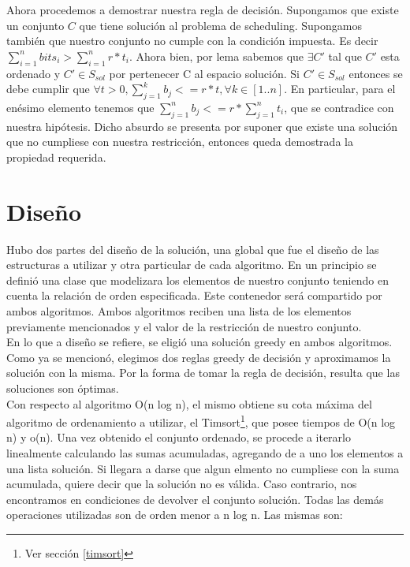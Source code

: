 \documentclass[12pt]{article}
\begin{document}
Ahora procedemos a demostrar nuestra regla de decisi\'on. Supongamos que existe un conjunto $C$ que tiene soluci\'on al
 problema de scheduling. Supongamos tambi\'en que nuestro conjunto no cumple con la condici\'on impuesta. Es decir $\sum\limits_{i=1}^n bits_i > \sum\limits_{i=1}^n r * t_i$.
 Ahora bien, por lema sabemos que $\exists C'$ tal que $C'$ esta ordenado y $C' \in S_{sol}$ por pertenecer C al espacio soluci\'on. Si $C' \in S_{sol}$ entonces se debe cumplir que 
$\forall t > 0, \sum\limits_{j = 1}^k b_j <= r * t, \forall k \in [1..n]$. En particular, para el en\'esimo elemento tenemos que $\sum\limits_{j = 1}^n b_j <= r * \sum\limits_{j = 1}^n t_i$, que se contradice con nuestra hip\'otesis. Dicho
absurdo se presenta por suponer que existe una soluci\'on que no cumpliese con nuestra restricci\'on, entonces queda demostrada la propiedad requerida.
\newpage
\section{Dise\~no}\label{diseño}
Hubo dos partes del diseño de la soluci\'on, una global que fue el diseño de las estructuras a utilizar y otra particular de cada algoritmo. En un principio se defini\'o una clase que modelizara los elementos de nuestro conjunto teniendo en cuenta la relaci\'on de orden especificada. Este contenedor ser\'a compartido por ambos algoritmos. Ambos algoritmos reciben una lista de los elementos previamente mencionados y el valor de la restricci\'on de nuestro conjunto.\\
En lo que a diseño se refiere, se eligi\'o una soluci\'on greedy en ambos algoritmos. Como ya se mencion\'o, elegimos dos reglas greedy de decisi\'on y aproximamos la soluci\'on con la misma. Por la forma de tomar la regla de decisi\'on, resulta que las soluciones son \'optimas.\\
Con respecto al algoritmo O(n log n), el mismo obtiene su cota m\'axima del algoritmo de ordenamiento a utilizar, el Timsort\footnote{Ver secci\'on \ref{timsort}}, que posee tiempos de O(n log n) y o(n). Una vez obtenido el conjunto ordenado, se procede a iterarlo linealmente calculando las sumas acumuladas, agregando de a uno los elementos a una lista soluci\'on. Si llegara a darse que algun elmento no cumpliese con la suma acumulada, quiere decir que la soluci\'on no es v\'alida. Caso contrario, nos encontramos en condiciones de devolver el conjunto soluci\'on. Todas las dem\'as operaciones utilizadas son de orden menor a n log n. Las mismas son:
\end{document}
